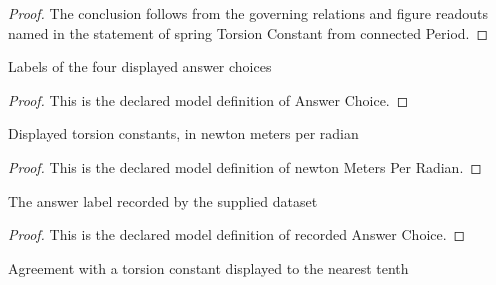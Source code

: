 \begin{proof}
  The conclusion follows from the governing relations and figure readouts named in the statement of spring Torsion Constant from connected Period.
\end{proof}
\begin{definition}
  \label{def:physics:phyx-mini-0270:phyxminiproblems-problemphyxmini0270-answerchoice}
  Labels of the four displayed answer choices
\end{definition}
\begin{proof}
  This is the declared model definition of Answer Choice.
\end{proof}
\begin{definition}
  \label{def:physics:phyx-mini-0270:phyxminiproblems-problemphyxmini0270-answerchoice-newtonmetersperradian}
  Displayed torsion constants, in newton meters per radian
\end{definition}
\begin{proof}
  This is the declared model definition of newton Meters Per Radian.
\end{proof}
\begin{definition}
  \label{def:physics:phyx-mini-0270:phyxminiproblems-problemphyxmini0270-recordedanswerchoice}
  The answer label recorded by the supplied dataset
\end{definition}
\begin{proof}
  This is the declared model definition of recorded Answer Choice.
\end{proof}
\begin{definition}
  \label{def:physics:phyx-mini-0270:phyxminiproblems-problemphyxmini0270-matchesdisplayedtorsionconstant}
  Agreement with a torsion constant displayed to the nearest tenth
\end{definition}
